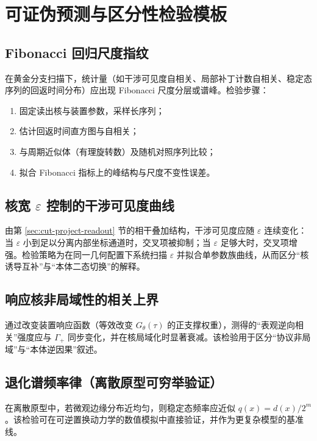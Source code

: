\section{可证伪预测与区分性检验模板}\label{sec:falsifiable}

\subsection{Fibonacci 回归尺度指纹}

在黄金分支扫描下，统计量（如干涉可见度自相关、局部补丁计数自相关、稳定态序列的回返时间分布）应出现 Fibonacci 尺度分层或谱峰。检验步骤：
\begin{enumerate}
  \item 固定读出核与装置参数，采样长序列；
  \item 估计回返时间直方图与自相关；
  \item 与周期近似体（有理旋转数）及随机对照序列比较；
  \item 拟合 Fibonacci 指标上的峰结构与尺度不变性误差。
\end{enumerate}

\subsection{核宽 \texorpdfstring{$\varepsilon$}{epsilon} 控制的干涉可见度曲线}

由第 \ref{sec:cut-project-readout} 节的相干叠加结构，干涉可见度应随 $\varepsilon$ 连续变化：当 $\varepsilon$ 小到足以分离内部坐标通道时，交叉项被抑制；当 $\varepsilon$ 足够大时，交叉项增强。检验策略为在同一几何配置下系统扫描 $\varepsilon$ 并拟合单参数族曲线，从而区分“核诱导互补”与“本体二态切换”的解释。

\subsection{响应核非局域性的相关上界}

通过改变装置响应函数（等效改变 $G_{\theta}(\tau)$ 的正支撑权重），测得的“表观逆向相关”强度应与 $\Gamma_+$ 同步变化，并在核局域化时显著衰减。该检验用于区分“协议非局域”与“本体逆因果”叙述。

\subsection{退化谱频率律（离散原型可穷举验证）}

在离散原型中，若微观边缘分布近均匀，则稳定态频率应近似 $q(x)=d(x)/2^m$。该检验可在可逆置换动力学的数值模拟中直接验证，并作为更复杂模型的基准线。

